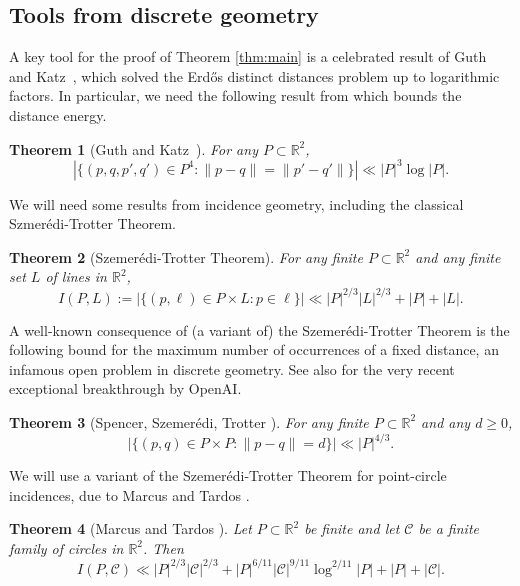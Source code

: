 \documentclass[11pt,oneside]{amsart}
\numberwithin{exercise}{subsection}
\newtheorem{theorem}{Theorem}
\begin{document}
\subsection{Tools from discrete geometry}

A key tool for the proof of Theorem \ref{thm:main} is a celebrated result of Guth and Katz~\cite{GuKa15}, which solved the Erd\H{o}s distinct distances problem up to logarithmic factors. In particular, we need the following result from \cite{GuKa15} which bounds the distance energy. 

\begin{theorem}[Guth and Katz~\cite{GuKa15}] \label{thm:GK}
 For any $P \subset \mathbb R^2$,
 \[
| \{ (p,q,p',q') \in P^4 : \| p-q\|=\|p'-q' \| \}|\ll |P|^3 \log|P|.
 \]
\end{theorem}



We will need some results from incidence geometry, including the classical Szmer\'{e}di-Trotter Theorem.

\begin{theorem}[Szemer\'{e}di-Trotter Theorem]
\label{ST}
For any finite $P \subset \mathbb R^2$ and any finite set $L$ of lines in $\mathbb R^2$,
\[
I(P,L) := | \{ (p,\ell) \in P \times L : p \in \ell \}| \ll |P|^{2/3}| L|^{2/3}   + |P| + |L|.
\]
\end{theorem}

A well-known consequence of (a variant of) the Szemer\'{e}di-Trotter Theorem is the following bound \cite{SST83} for the maximum number of occurrences of a fixed distance, an infamous open problem in discrete geometry. See also \cite{OpenAI2026PlanarUnitDistanceBlog,Sawin2026UnitDistance} for the very recent exceptional breakthrough by OpenAI.

\begin{theorem} [Spencer, Szemer\'edi, Trotter \cite{SST83}]\label{thm:unit}
For any finite $P \subset \mathbb R^2$ and any $d \geq 0$,
\[
|\{(p,q) \in P \times P :  \|p-q\|=d \}| \ll |P|^{4/3}.
\]
\end{theorem}

We will use a variant of the Szemer\'{e}di-Trotter Theorem for point-circle incidences, due to Marcus and Tardos \cite{MaTa06}.

\begin{theorem}[Marcus and Tardos \cite{MaTa06}]\label{thm:circleincidences}
Let $P \subset \mathbb R^2$ be finite and let $ \mathcal C$ be a finite family of circles in $\mathbb R^2$. Then
\[
 I(P, \mathcal C) \ll |P|^{2/3}| \mathcal C|^{2/3} + |P|^{6/11}|\mathcal C|^{9/11} \log^{2/11} |P| + |P| + | \mathcal C|.
\]

\end{theorem}
\end{document}
